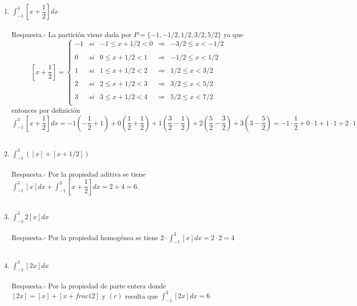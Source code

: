 \begin{enumerate}[ \bfseries 1.]
\begin{enumerate}[\bfseries (a)]
	\item $\displaystyle\int_{-1}^{3} \left[ x + \dfrac{1}{2} \right] dx$\\\\
	    Respuesta.-\; La partición viene dada por $P=\lbrace -1,-1/2,1/2,3/2,5/2\rbrace$ ya que 
	    $$\left[x + \dfrac{1}{2} \right] = \left\{ \begin{array}{rclcl}
		-1&si&-1\leq x + 1/2 < 0&\Longrightarrow&-3/2 \leq x < -1/2\\
		\\ 0&si&0\leq x + 1/2 < 1&\Longrightarrow&-1/2 \leq x < 1/2\\
		\\ 1&si&1\leq x + 1/2 < 2&\Longrightarrow&1/2 \leq x < 3/2\\
		\\ 2&si&2 \leq x + 1/2 < 3&\Longrightarrow&3/2 \leq x < 5/2\\
		\\ 3&si &3 \leq x + 1/2 < 4&\Longrightarrow&5/2 \leq x < 7/2 \\
	    \end{array}\right.$$
	     entonces por definición $\displaystyle\int_{-1}^{3} \left[x + \dfrac{1}{2}\right] dx = -1\left(-\dfrac{1}{2} + 1\right) + 0 \left( \dfrac{1}{2} + \dfrac{1}{2}\right) + 1\left(\dfrac{3}{2} - \dfrac{1}{2}\right) + 2\left( \dfrac{5}{2} - \dfrac{3}{2}\right) + 3\left( 3 - \dfrac{5}{2}\right) = -1\cdot \dfrac{1}{2} + 0\cdot 1 + 1\cdot 1 + 2\cdot 1 + 3\cdot \dfrac{1}{2} = 4$\\\\
	 \item $\displaystyle\int_{-1}^{3} \left([x] + [x + 1/2]\right)$\\\\
	     Respuesta.-\; Por la propiedad aditiva se tiene $\displaystyle\int_{-1}^{3} [x] dx + \int_{-1}^{3} \left[x + \dfrac{1}{2}\right] dx = 2+4=6$.\\\\  

	\item $\displaystyle\int_{-1}^{3} 2[x] dx$\\\\
	    Respuesta.-\; Por la propiedad homogénea se tiene $2\cdot \displaystyle\int_{-1}^{3} [x] dx = 2\cdot 2 = 4$\\\\

	\item $\displaystyle\int_{-1}^{3} [2x] dx$\\\\
	    Respuesta.-\; Por la propiedad de parte entera donde $[2x] = [x] + [x + frac{1}{2}]$ y $(c)$ resulta que $\displaystyle\int_{-1}^{3} [2x] dx = 6$\\\\


\end{enumerate}
\end{enumerate}
